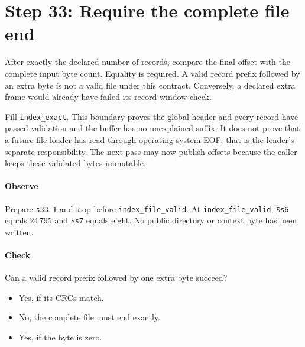 \section{Step 33: Require the complete file end}
After exactly the declared number of records, compare the final offset
with the complete input byte count. Equality is required. A valid record prefix
followed by an extra byte is not a valid file under this contract. Conversely,
a declared extra frame would already have failed its record-window check.

Fill \texttt{index\_exact}. This boundary proves the global header and every
record have passed validation and the buffer has no unexplained suffix. It does
not prove that a future file loader has read through operating-system EOF; that
is the loader's separate responsibility. The next pass may now publish offsets
because the caller keeps these validated bytes immutable.

\paragraph{Observe} Prepare \texttt{s33-1} and stop before
\texttt{index\_file\_valid}. At \texttt{index\_file\_valid}, \texttt{\$s6} equals
24\,795 and \texttt{\$s7} equals eight. No public directory or context
byte has been written.

\paragraph{Check} Can a valid record prefix followed by one extra byte succeed?
\begin{itemize}
  \item[A.] Yes, if its CRCs match.
  \item[B.] No; the complete file must end exactly.
  \item[C.] Yes, if the byte is zero.
\end{itemize}
